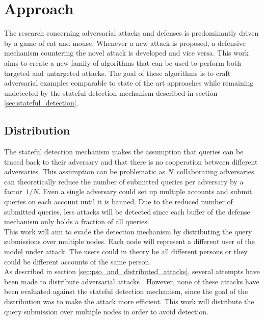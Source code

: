 \chapter{Approach}
The research concerning adversarial attacks and defenses is predominantly driven by a game of cat and mouse. Whenever a new attack is proposed, a defensive mechanism countering the novel attack is developed and vice versa. This work aims to create a new family of algorithms that can be used to perform both targeted and untargeted attacks. The goal of these algorithms is to craft adversarial examples comparable to state of the art approaches while remaining undetected by the stateful detection mechanism \cite{chen_stateful_2019} described in section \ref{sec:stateful_detection}.

\section{Distribution}
The stateful detection mechanism \cite{chen_stateful_2019} makes the assumption that queries can be traced back to their adversary and that there is no cooperation between different adversaries. This assumption can be problematic as $N$~collaborating adversaries can theoretically reduce the number of submitted queries per adversary by a factor~$1/N$. Even a single adversary could set up multiple accounts and submit queries on each account until it is banned. Due to the reduced number of submitted queries, less attacks will be detected since each buffer of the defense mechanism only holds a fraction of all queries.\\

This work will aim to evade the detection mechanism by distributing the query submissions over multiple nodes. Each node will represent a different user of the model under attack. The users could in theory be all different persons or they could be different accounts of the same person.\\

As described in section \ref{sec:pso_and_distributed_attacks}, several attempts have been made to distribute adversarial attacks \cite{distributed_pso_attack, suryanto2020}. However, none of these attacks have been evaluated against the stateful detection mechanism, since the goal of the distribution was to make the attack more efficient. This work will distribute the query submission over multiple nodes in order to avoid detection.\\

